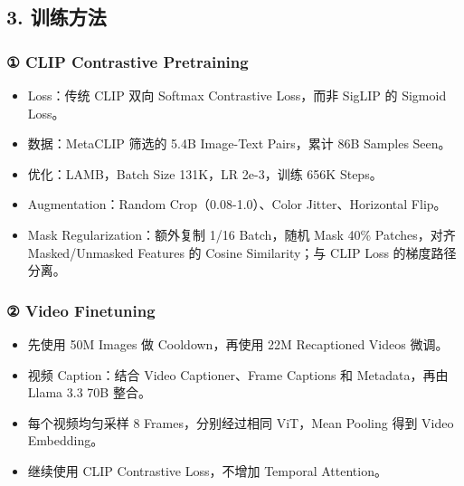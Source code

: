 \subsection{3.\allowbreak{} 训练方法}
\subsubsection{{①} CLIP Contrastive Pretraining}
\begin{itemize}
\item Loss：传统 CLIP 双向 Softmax Contrastive Loss，而非 SigLIP 的 Sigmoid Loss。
\item 数据：MetaCLIP 筛选的 5.\allowbreak{}4B Image-\allowbreak{}Text Pairs，累计 86B Samples Seen。
\item 优化：LAMB，Batch Size 131K，LR 2e-\allowbreak{}3，训练 656K Steps。
\item Augmentation：Random Crop（0.\allowbreak{}08-1.\allowbreak{}0）、Color Jitter、Horizontal Flip。
\item Mask Regularization：额外复制 1/\allowbreak{}16 Batch，随机 Mask 40\% Patches，对齐 Masked/\allowbreak{}Unmasked Features 的 Cosine Similarity；与 CLIP Loss 的梯度路径分离。
\end{itemize}
\subsubsection{{②} Video Finetuning}
\begin{itemize}
\item 先使用 50M Images 做 Cooldown，再使用 22M Recaptioned Videos 微调。
\item 视频 Caption：结合 Video Captioner、Frame Captions 和 Metadata，再由 Llama 3.\allowbreak{}3 70B 整合。
\item 每个视频均匀采样 8 Frames，分别经过相同 ViT，Mean Pooling 得到 Video Embedding。
\item 继续使用 CLIP Contrastive Loss，不增加 Temporal Attention。
\end{itemize}
